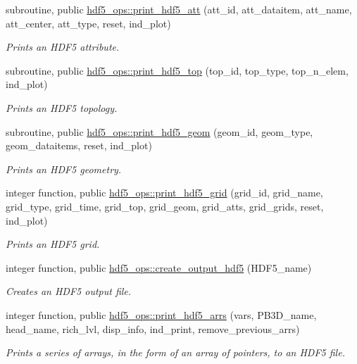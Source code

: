 \begin{DoxyCompactItemize}
subroutine, public \hyperlink{namespacehdf5__ops_a4d0ba813f369f904a9e991804662d099}{hdf5\+\_\+ops\+::print\+\_\+hdf5\+\_\+att} (att\+\_\+id, att\+\_\+dataitem, att\+\_\+name, att\+\_\+center, att\+\_\+type, reset, ind\+\_\+plot)
\begin{DoxyCompactList}\small\item\em Prints an H\+D\+F5 attribute. \end{DoxyCompactList}\item 
subroutine, public \hyperlink{namespacehdf5__ops_af34b4aea64a8b67ec827aaf4a7425caf}{hdf5\+\_\+ops\+::print\+\_\+hdf5\+\_\+top} (top\+\_\+id, top\+\_\+type, top\+\_\+n\+\_\+elem, ind\+\_\+plot)
\begin{DoxyCompactList}\small\item\em Prints an H\+D\+F5 topology. \end{DoxyCompactList}\item 
subroutine, public \hyperlink{namespacehdf5__ops_ac23a71e7029f46e5f38a95468fc10e22}{hdf5\+\_\+ops\+::print\+\_\+hdf5\+\_\+geom} (geom\+\_\+id, geom\+\_\+type, geom\+\_\+dataitems, reset, ind\+\_\+plot)
\begin{DoxyCompactList}\small\item\em Prints an H\+D\+F5 geometry. \end{DoxyCompactList}\item 
integer function, public \hyperlink{namespacehdf5__ops_a144d595445778d89ec1a1bc0b12a94fb}{hdf5\+\_\+ops\+::print\+\_\+hdf5\+\_\+grid} (grid\+\_\+id, grid\+\_\+name, grid\+\_\+type, grid\+\_\+time, grid\+\_\+top, grid\+\_\+geom, grid\+\_\+atts, grid\+\_\+grids, reset, ind\+\_\+plot)
\begin{DoxyCompactList}\small\item\em Prints an H\+D\+F5 grid. \end{DoxyCompactList}\item 
integer function, public \hyperlink{namespacehdf5__ops_a1263636fffc4f4aa86f72bd5fd3352a0}{hdf5\+\_\+ops\+::create\+\_\+output\+\_\+hdf5} (H\+D\+F5\+\_\+name)
\begin{DoxyCompactList}\small\item\em Creates an H\+D\+F5 output file. \end{DoxyCompactList}\item 
integer function, public \hyperlink{namespacehdf5__ops_af80b879ed614698ed91b8235cf1cb22a}{hdf5\+\_\+ops\+::print\+\_\+hdf5\+\_\+arrs} (vars, P\+B3\+D\+\_\+name, head\+\_\+name, rich\+\_\+lvl, disp\+\_\+info, ind\+\_\+print, remove\+\_\+previous\+\_\+arrs)
\begin{DoxyCompactList}\small\item\em Prints a series of arrays, in the form of an array of pointers, to an H\+D\+F5 file. \end{DoxyCompactList}\item 

\end{DoxyCompactItemize}
